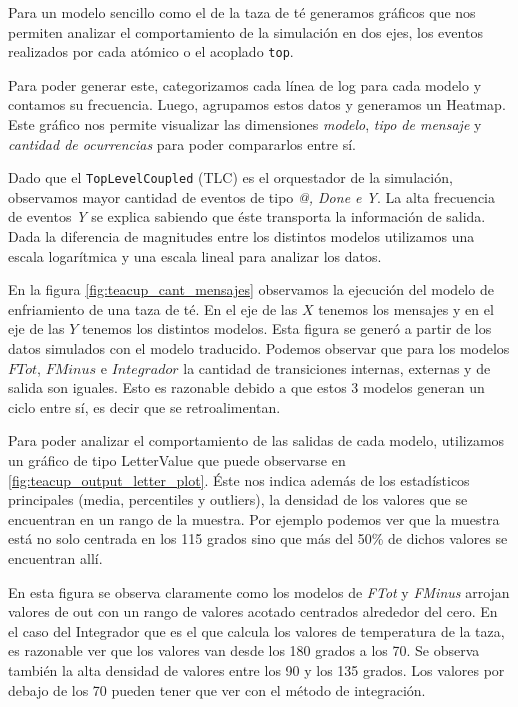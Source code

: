 Para un modelo sencillo como el de la taza de té generamos gráficos que nos
permiten analizar el comportamiento de la simulación en dos ejes, los eventos
realizados por cada atómico o el acoplado \texttt{top}.

Para poder generar este, categorizamos cada línea de log para cada modelo y
contamos su frecuencia. Luego, agrupamos estos datos y generamos un Heatmap.
Este gráfico nos permite visualizar las dimensiones \textit{modelo}, \textit{tipo de mensaje} y
\textit{cantidad de ocurrencias} para poder compararlos entre sí.

Dado que el \texttt{TopLevelCoupled} (TLC)  es el orquestador de la simulación,
observamos mayor cantidad de eventos de tipo \textit{@, Done e Y}. La alta
frecuencia de eventos \textit{Y} se explica sabiendo que éste  transporta la
información de salida. Dada la diferencia de magnitudes entre los distintos
modelos utilizamos una escala logarítmica y una escala lineal para analizar los
datos.

En la figura \ref{fig:teacup_cant_mensajes} observamos la  ejecución del modelo
de enfriamiento de una taza de té. En el eje de las $X$ tenemos los mensajes 
y en el eje de las $Y$ tenemos los distintos modelos. 
Esta figura se generó a partir de los datos simulados con el modelo traducido.
Podemos observar que para los modelos $FTot$, $FMinus$ e $Integrador$ la cantidad 
de transiciones internas, externas y de salida son iguales. Esto es razonable 
debido a que estos 3 modelos generan un ciclo entre sí, es decir que se retroalimentan.

Para poder analizar el comportamiento de las salidas de cada modelo, utilizamos
un gráfico de tipo LetterValue que puede observarse en \ref{fig:teacup_output_letter_plot}.
Éste nos indica además de los estadísticos principales (media, percentiles y outliers), 
la densidad de los valores que se encuentran en un rango de la muestra. 
Por ejemplo podemos ver que la muestra está no solo centrada en los 115 grados sino que 
más del 50\% de dichos valores se encuentran allí. 

En esta figura se observa claramente como los modelos de \textit{FTot} y \textit{FMinus} 
arrojan valores de out con un rango de valores acotado centrados alrededor del cero. 
En el caso del Integrador que es el que calcula los valores de temperatura de la taza, 
es razonable ver que los valores van desde los 180 grados a los 70. Se observa también 
la alta densidad de valores entre los 90 y los 135 grados. Los valores por debajo de los 
70 pueden tener que ver con el método de integración. 

